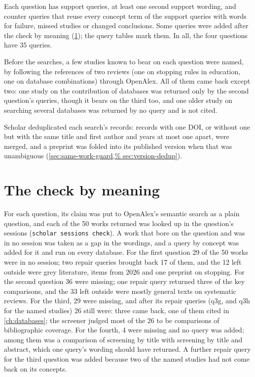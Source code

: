 Each question has support queries, at least one second support wording,
and counter queries that reuse every concept term of the support
queries with words for failure, missed studies or changed conclusions.
Some queries were added after the check by meaning
(\cref{sec:search-check}); the query tables mark them.
In all, the four questions have 35 queries.

Before the searches, a few studies known to bear on each question were
named, by following the references of two reviews (one on stopping
rules in education, one on database combinations) through OpenAlex.
All of them came back except two: one study on the contribution of
databases was returned only by the second question's queries, though it
bears on the third too, and one older study on searching several
databases was returned by no query and is not cited.

Scholar deduplicated each search's records: records with one DOI, or
without one but with the same title and first author and years at most
one apart, were merged, and a preprint was folded into its published
version when that was unambiguous (\cref{sec:same-work-guard,%
sec:version-dedup}).

\section{The check by meaning}
\label{sec:search-check}

For each question, its claim was put to OpenAlex's semantic search as a
plain question, and each of the 50 works returned was looked up in the
question's sessions (\texttt{scholar sessions check}).
A work that bore on the question and was in no session was taken as a
gap in the wordings, and a query by concept was added for it and run on
every database.
For the first question 29 of the 50 works were in no session; two
repair queries brought back 17 of them, and the 12 left outside were
grey literature, items from 2026 and one preprint on stopping.
For the second question 36 were missing; one repair query returned three
of the key comparisons, and the 33 left outside were mostly general
texts on systematic reviews.
For the third, 29 were missing, and after its repair queries (q3g, and
q3h for the named studies) 26 still were: three came back, one of them
cited in \cref{ch:databases}; the screener judged most of the 26 to be
comparisons of bibliographic coverage.
For the fourth, 4 were missing and no query was added; among them was a
comparison of screening by title with screening by title and abstract,
which one query's wording should have returned.
A further repair query for the third question was added because two of
the named studies had not come back on its concepts.

